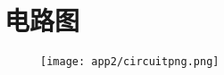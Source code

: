 
\chapter{电路图}
\label{app:circuit}
\begin{figure}[!bh]
  \centering
  \texttt{[image: app2/circuitpng.png]}
\end{figure}



